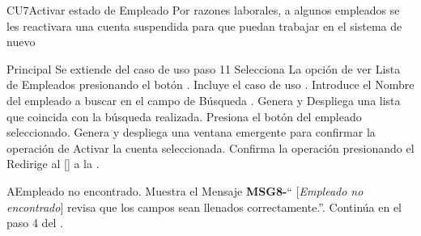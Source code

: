 \begin{UseCase}{CU7}{Activar estado de Empleado}{
		Por razones laborales, a algunos empleados se les reactivara una cuenta suspendida para que puedan trabajar en el sistema de nuevo
	}
	\end{UseCase}
	\begin{UCtrayectoria}{Principal}
		\UCpaso Se extiende del caso de uso  paso 11
		\UCpaso[\UCactor] Selecciona La opción de ver Lista de  Empleados presionando el botón .
		\UCpaso Incluye el caso de uso .
		\UCpaso[\UCactor] Introduce el Nombre del empleado a buscar en el campo de Búsqueda  .
		\UCpaso Genera y Despliega una lista que coincida con la búsqueda realizada.
		\UCpaso[\UCactor] Presiona el botón del empleado seleccionado.
		\UCpaso Genera y despliega una ventana emergente para confirmar la operación de Activar la cuenta seleccionada.
		\UCpaso [\UCactor] Confirma la operación presionando el 
		\UCpaso Redirige al [\UCactor] a la  .
	\end{UCtrayectoria}


\begin{UCtrayectoriaA}{A}{Empleado no encontrado.}
			\UCpaso Muestra el Mensaje {\bf MSG8-}`` [{\em Empleado no encontrado}] revisa que los campos sean llenados correctamente.''.
			\UCpaso Continúa en el paso 4 del .
		\end{UCtrayectoriaA}
